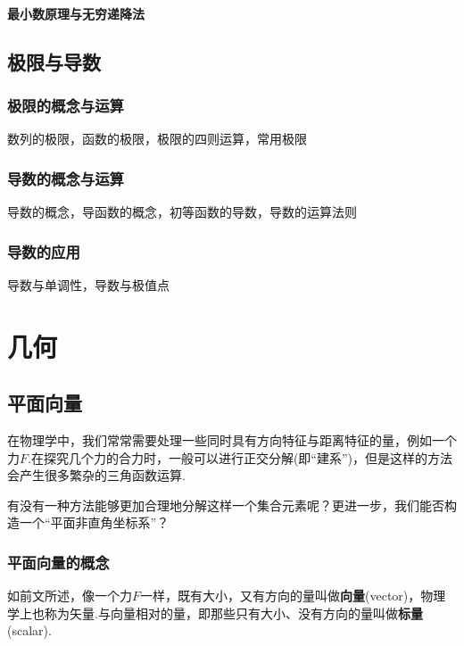 \documentclass[lang=cn, zihao=4.5]{elegantbook}
\begin{document}
\subsection{最小数原理与无穷递降法}

\chapter{极限与导数}

\section{极限的概念与运算}

数列的极限，函数的极限，极限的四则运算，常用极限

\section{导数的概念与运算}

导数的概念，导函数的概念，初等函数的导数，导数的运算法则

\section{导数的应用}

导数与单调性，导数与极值点

\part{几何}

\chapter{平面向量}

在物理学中，我们常常需要处理一些同时具有方向特征与距离特征的量，例如一个力$F$.在探究几个力的合力时，一般可以进行正交分解(即“建系”)，但是这样的方法会产生很多繁杂的三角函数运算.

有没有一种方法能够更加合理地分解这样一个集合元素呢？更进一步，我们能否构造一个“平面非直角坐标系”？

\section{平面向量的概念}


如前文所述，像一个力$F$一样，既有大小，又有方向的量叫做\textbf{向量}(vector)，物理学上也称为矢量.与向量相对的量，即那些只有大小、没有方向的量叫做\textbf{标量}(scalar).
\end{document}
